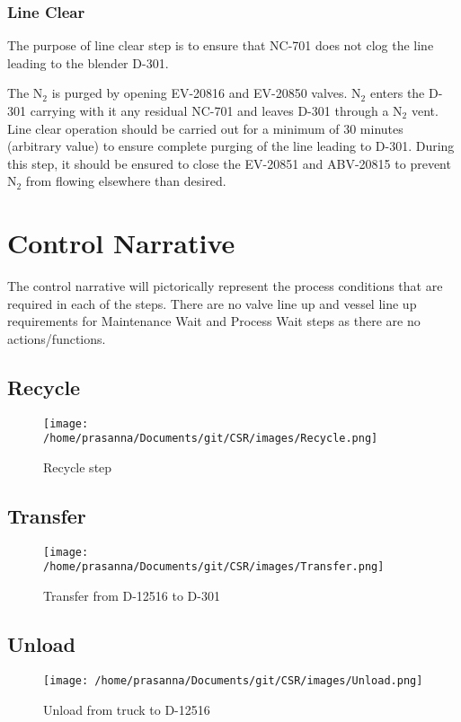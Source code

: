 \documentclass[a4paper,oneside]{article}
\begin{document}
\subsubsection{Line Clear}
\label{sec:org9dfdd9e}
The purpose of line clear step is to ensure that NC-701 does not clog
the line leading to the blender D-301.

The N\(_{\text{2}}\) is purged by opening EV-20816 and EV-20850 valves. N\(_{\text{2}}\)
enters the D-301 carrying with it any residual NC-701 and leaves D-301
through a N\(_{\text{2}}\) vent. Line clear operation should be carried out for a
minimum of 30 minutes (arbitrary value) to ensure complete purging of
the line leading to D-301. During this step, it should be ensured to
close the EV-20851 and ABV-20815 to prevent N\(_{\text{2}}\) from flowing
elsewhere than desired.
\section{Control Narrative}
\label{sec:org3e672d5}
The control narrative will pictorically represent the process
conditions that are required in each of the steps. There are no valve
line up and vessel line up requirements for Maintenance Wait and
Process Wait steps as there are no actions/functions.
\subsection{Recycle}
\label{sec:org55d0c30}
\begin{figure}[htbp]
\centering
\texttt{[image: /home/prasanna/Documents/git/CSR/images/Recycle.png]}
\caption{Recycle step}
\end{figure}


\subsection{Transfer}
\label{sec:orgea78c1a}
\begin{figure}[htbp]
\centering
\texttt{[image: /home/prasanna/Documents/git/CSR/images/Transfer.png]}
\caption{Transfer from D-12516 to D-301}
\end{figure}
\subsection{Unload}
\label{sec:org520fe34}
\begin{figure}[htbp]
\centering
\texttt{[image: /home/prasanna/Documents/git/CSR/images/Unload.png]}
\caption{Unload from truck to D-12516}
\end{figure}
\end{document}
